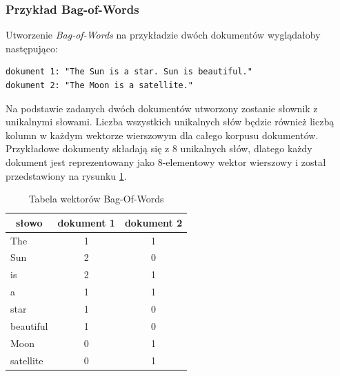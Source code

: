 \subsubsection*{Przykład Bag-of-Words}
Utworzenie \textit{Bag-of-Words} na przykładzie dwóch dokumentów \cite{bow-example} wyglądałoby następująco: \\ \hfill
\begin{lstlisting}[style=someShit]
dokument 1: "The Sun is a star. Sun is beautiful."
dokument 2: "The Moon is a satellite."
\end{lstlisting}
Na podstawie zadanych dwóch dokumentów utworzony zostanie słownik z unikalnymi słowami. Liczba wszystkich unikalnych słów będzie również liczbą kolumn w każdym wektorze wierszowym dla całego korpusu dokumentów.\\

Przykładowe dokumenty składają się z 8 unikalnych słów, dlatego każdy dokument jest reprezentowany jako 8-elementowy wektor wierszowy i został przedstawiony na rysunku \ref{vectors-bow}.

\begin{table}[ht!]
\centering
\caption{Tabela wektorów Bag-Of-Words}
\label{vectors-bow}
\begin{tabular}{|l|c|c|}
\hline
\multicolumn{1}{|c|}{\textbf{słowo}} & \textbf{dokument 1} & \multicolumn{1}{l|}{\textbf{dokument 2}} \\ \hline
The                                                          & 1                   & 1                                                                \\ \hline
Sun                                                          & 2                   & 0                                                                \\ \hline
is                                                           & 2                   & 1                                                                \\ \hline
a                                                            & 1                   & 1                                                                \\ \hline
star                                                         & 1                   & 0                                                                \\ \hline
beautiful                                                    & 1                   & 0                                                                \\ \hline
Moon                                                         & 0                   & 1                                                                \\ \hline
satellite                                                    & 0                   & 1                                                                \\ \hline
\end{tabular}
\end{table}

